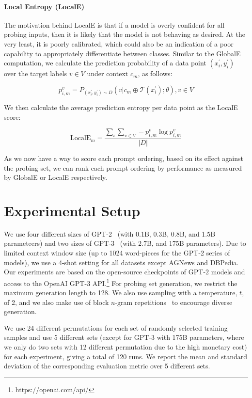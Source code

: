 \paragraph{Local Entropy (LocalE)} { The motivation behind LocalE is that if a model is overly confident for all probing inputs, then it is likely that the model is not behaving as desired. At the very least, it is poorly calibrated, which could also be an indication of a poor capability to appropriately differentiate between classes. Similar to the GlobalE computation, we calculate the prediction probability of a data point $(x^{'}_i, y^{'}_i)$ over the target labels $v \in V$ under context $c_m$, as follows:

\begin{equation}
    p^{v}_{i,m} =P_{(x^{'}_i, y^{'}_i) \sim D}(v|c_m\oplus \mathcal{T}(x^{'}_i);\theta ), v \in V
\end{equation}

We then calculate the average prediction entropy per data point as the LocalE score:

\begin{equation}
    \text{LocalE}_{m} = \frac{ \sum_{i} \sum_{v \in V} - p^{v}_{i,m} \log p^{v}_{i,m} }{|D|}
\end{equation}

} As we now have a way to score each prompt ordering, based on its effect against the probing set, we can rank each prompt ordering by performance as measured by GlobalE or LocalE respectively.

\section{Experimental Setup}

We use four different sizes of GPT-2~\citep{Radford2019LanguageMA} (with 0.1B, 0.3B, 0.8B, and 1.5B parameteers) and two sizes of GPT-3~\citep{brown2020language} (with 2.7B, and 175B parameters). Due to limited context window size (up to 1024 word-pieces for the GPT-2 series of models), we use a 4-shot setting for all datasets except AGNews and DBPedia. Our experiments are based on the open-source checkpoints of GPT-2 models and access to the OpenAI GPT-3 API.\footnote{https://openai.com/api/}
For probing set generation, we restrict the maximum generation length to 128. We also use sampling with a temperature, $t$, of 2, and we also make use of block $n$-gram repetitions~\cite{paulus2018deep} to encourage diverse generation.

We use 24 different permutations for each set of randomly selected training samples and use 5 different sets (except for GPT-3 with 175B parameters, where we only do two sets with 12 different permutation due to the high monetary cost) for each experiment, giving a total of 120 runs. We report the mean and standard deviation of the corresponding evaluation metric over 5 different sets.

